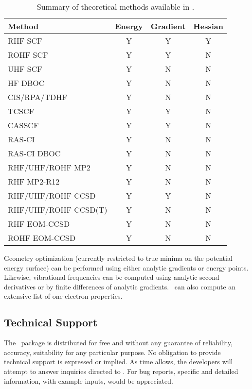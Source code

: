\begin{table}
\caption{Summary of theoretical methods available in \PSIthree.} \label{table:methods}
\parsep 10pt
\begin{center}
\begin{tabular}{lccc} \hline\hline
Method           & Energy & Gradient & Hessian \\ \hline
RHF SCF          & Y & Y & Y \\
ROHF SCF         & Y & Y & N \\
UHF SCF          & Y & N & N \\
HF DBOC          & Y & N & N \\
CIS/RPA/TDHF     & Y & N & N \\
TCSCF            & Y & Y & N \\
CASSCF           & Y & Y & N \\
RAS-CI           & Y & N & N \\
RAS-CI DBOC      & Y & N & N \\
RHF/UHF/ROHF MP2     & Y & N & N \\
RHF MP2-R12      & Y & N & N \\
RHF/UHF/ROHF CCSD    & Y & Y & N \\
RHF/UHF/ROHF CCSD(T) & Y & N & N \\
RHF EOM-CCSD     & Y & N & N \\
ROHF EOM-CCSD    & Y & N & N \\
\hline\hline
\end{tabular}
\end{center}
\end{table}
Geometry optimization (currently restricted to true minima on the potential
energy surface) can be performed using either analytic gradients
or energy points.  Likewise, vibrational frequencies can be 
computed using analytic second derivatives or by finite
differences of analytic gradients.
\PSIthree\ can also compute an extensive list of one-electron properties.

\subsection{Technical Support}
The \PSIthree\ package is distributed for free and without any guarantee
of reliability, accuracy, suitability for any particular purpose.  
No obligation to provide technical support is expressed or implied.  
As time allows, the developers will attempt to answer inquiries directed
to 
.
For bug reports, specific and detailed information, with example inputs,
would be appreciated.




